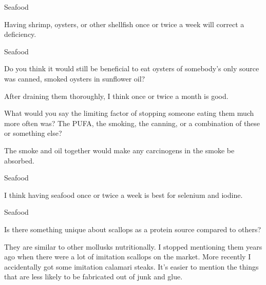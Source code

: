 \documentclass[11pt,oneside,openany,extrafontsizes]{memoir}
\begin{document}
\begin{standalonequote}{Seafood}

    \begin{answer}
        Having shrimp, oysters, or other shellfish once or twice a week will correct a deficiency.
    \end{answer}
\end{standalonequote}

\begin{emailexchange}{Seafood}

    \begin{question}
        Do you think it would still be beneficial to eat oysters of somebody's only source was canned, smoked oysters in sunflower oil?
    \end{question}

    \begin{answer}
      After draining them thoroughly, I think once or twice a month is good.
    \end{answer}

    \begin{question}
        What would you say the limiting factor of stopping someone eating them much more often was? The PUFA, the smoking, the canning, or a combination of these or something else?
    \end{question}

    \begin{answer}
      The smoke and oil together would make any carcinogens in the smoke be absorbed.
    \end{answer}
\end{emailexchange}

\begin{standalonequote}{Seafood}

    \begin{answer}
       I think having seafood once or twice a week is best for selenium and iodine.
    \end{answer}
\end{standalonequote}

\begin{qaexchange}{Seafood}

    \begin{question}
         Is there something unique about scallops as a protein source compared to others?
    \end{question}

    \begin{answer}
      They are similar to other mollusks nutritionally. I stopped mentioning them years ago when there were a lot of imitation scallops on the market. More recently I accidentally got some imitation calamari steaks. It's easier to mention the things that are less likely to be fabricated out of junk and glue.
    \end{answer}
\end{qaexchange}
\end{document}
